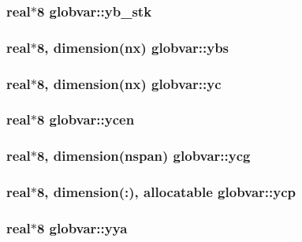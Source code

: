 \subsubsection[{yb\+\_\+stk}]{\setlength{\rightskip}{0pt plus 5cm}real$\ast$8 globvar\+::yb\+\_\+stk}\label{namespaceglobvar_a50b0561e08ecd21444c8d0138e8f23f8}
\hypertarget{namespaceglobvar_aabf35f2f56582d00668fde51696a4701}{}
\subsubsection[{ybs}]{\setlength{\rightskip}{0pt plus 5cm}real$\ast$8, dimension({\bf nx}) globvar\+::ybs}\label{namespaceglobvar_aabf35f2f56582d00668fde51696a4701}
\hypertarget{namespaceglobvar_aa12e45433bb052d282ad478af9f88e3a}{}
\subsubsection[{yc}]{\setlength{\rightskip}{0pt plus 5cm}real$\ast$8, dimension({\bf nx}) globvar\+::yc}\label{namespaceglobvar_aa12e45433bb052d282ad478af9f88e3a}
\hypertarget{namespaceglobvar_ac64739121560b1c588700a14f6bc9cae}{}
\subsubsection[{ycen}]{\setlength{\rightskip}{0pt plus 5cm}real$\ast$8 globvar\+::ycen}\label{namespaceglobvar_ac64739121560b1c588700a14f6bc9cae}
\hypertarget{namespaceglobvar_a7c65a1d76a91eab0217e09e6be6d2eb0}{}
\subsubsection[{ycg}]{\setlength{\rightskip}{0pt plus 5cm}real$\ast$8, dimension({\bf nspan}) globvar\+::ycg}\label{namespaceglobvar_a7c65a1d76a91eab0217e09e6be6d2eb0}
\hypertarget{namespaceglobvar_aceb6425a62e3d2fa8d2f17f17d83e558}{}
\subsubsection[{ycp}]{\setlength{\rightskip}{0pt plus 5cm}real$\ast$8, dimension(\+:), allocatable globvar\+::ycp}\label{namespaceglobvar_aceb6425a62e3d2fa8d2f17f17d83e558}
\hypertarget{namespaceglobvar_a8226618dfb2a1887783a72d33a768b30}{}
\subsubsection[{yya}]{\setlength{\rightskip}{0pt plus 5cm}real$\ast$8 globvar\+::yya}\label{namespaceglobvar_a8226618dfb2a1887783a72d33a768b30}
